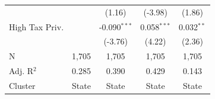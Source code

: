 \begin{tabular*}{\textwidth}{@{\extracolsep{\fill}}lcccc}
                              &                & (1.16)         & (-3.98)        & (1.86)\\   
   High Tax Priv.             &                & -0.090$^{***}$ & 0.058$^{***}$  & 0.032$^{**}$\\   
                              &                & (-3.76)        & (4.22)         & (2.36)\\   
   \hline
   N               & 1,705          & 1,705          & 1,705          & 1,705\\  
   Adj. R$^2$             & 0.285          & 0.390          & 0.429          & 0.143\\  
   Cluster              & State & State & State & State\\  
   \bottomrule
\end{tabular*}
\par\endgroup
